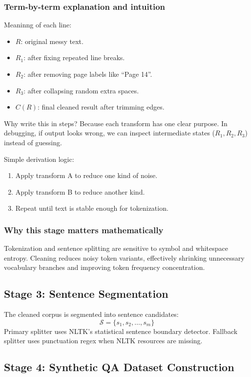 \documentclass[a4paper,11pt]{article}
\begin{document}
\subsubsection{Term-by-term explanation and intuition}
Meaninng of each line:
\begin{itemize}[leftmargin=1.5em]
    \item $R$: original messy text.
    \item $R_1$: after fixing repeated line breaks.
    \item $R_2$: after removing page labels like ``Page 14''.
    \item $R_3$: after collapsing random extra spaces.
    \item $C(R)$: final cleaned result after trimming edges.
\end{itemize}

Why write this in steps? Because each transform has one clear purpose. In debugging, if output looks wrong, we can inspect intermediate states ($R_1, R_2, R_3$) instead of guessing.

Simple derivation logic:
\begin{enumerate}[leftmargin=1.5em]
    \item Apply transform A to reduce one kind of noise.
    \item Apply transform B to reduce another kind.
    \item Repeat until text is stable enough for tokenization.
\end{enumerate}

\subsubsection{Why this stage matters mathematically}
Tokenization and sentence splitting are sensitive to symbol and whitespace entropy.
Cleaning reduces noisy token variants, effectively shrinking unnecessary vocabulary branches and improving token frequency concentration.

\subsection{Stage 3: Sentence Segmentation}
The cleaned corpus is segmented into sentence candidates:
\[
\mathcal{S} = \{s_1, s_2, \ldots, s_m\}
\]
Primary splitter uses NLTK's statistical sentence boundary detector.
Fallback splitter uses punctuation regex when NLTK resources are missing.

\subsection{Stage 4: Synthetic QA Dataset Construction}
\end{document}
